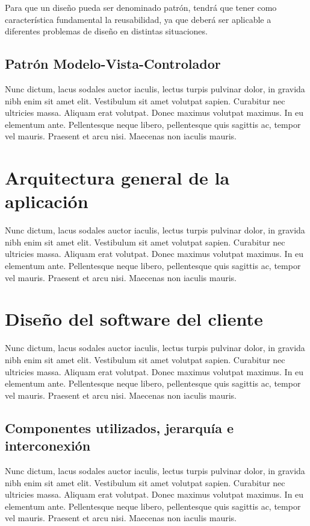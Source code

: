 Para que un diseño pueda ser denominado patrón, tendrá que tener como
característica fundamental la reusabilidad, ya que deberá ser aplicable a
diferentes problemas de diseño en distintas situaciones.

\subsection{Patrón Modelo-Vista-Controlador}

Nunc dictum, lacus sodales auctor iaculis, lectus turpis pulvinar dolor, in
gravida nibh enim sit amet elit. Vestibulum sit amet volutpat sapien. Curabitur
nec ultricies massa. Aliquam erat volutpat. Donec maximus volutpat maximus. In
eu elementum ante. Pellentesque neque libero, pellentesque quis sagittis ac,
tempor vel mauris. Praesent et arcu nisi. Maecenas non iaculis mauris.

\section{Arquitectura general de la aplicación}

Nunc dictum, lacus sodales auctor iaculis, lectus turpis pulvinar dolor, in
gravida nibh enim sit amet elit. Vestibulum sit amet volutpat sapien. Curabitur
nec ultricies massa. Aliquam erat volutpat. Donec maximus volutpat maximus. In
eu elementum ante. Pellentesque neque libero, pellentesque quis sagittis ac,
tempor vel mauris. Praesent et arcu nisi. Maecenas non iaculis mauris.

\section{Diseño del software del cliente}

Nunc dictum, lacus sodales auctor iaculis, lectus turpis pulvinar dolor, in
gravida nibh enim sit amet elit. Vestibulum sit amet volutpat sapien. Curabitur
nec ultricies massa. Aliquam erat volutpat. Donec maximus volutpat maximus. In
eu elementum ante. Pellentesque neque libero, pellentesque quis sagittis ac,
tempor vel mauris. Praesent et arcu nisi. Maecenas non iaculis mauris.

\subsection{Componentes utilizados, jerarquía e interconexión}

Nunc dictum, lacus sodales auctor iaculis, lectus turpis pulvinar dolor, in
gravida nibh enim sit amet elit. Vestibulum sit amet volutpat sapien. Curabitur
nec ultricies massa. Aliquam erat volutpat. Donec maximus volutpat maximus. In
eu elementum ante. Pellentesque neque libero, pellentesque quis sagittis ac,
tempor vel mauris. Praesent et arcu nisi. Maecenas non iaculis mauris.

